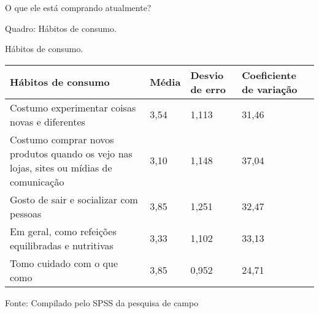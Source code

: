 \begin{commentA} \vspace{0.3cm} \noindent O que ele está comprando atualmente? \par \vspace{0.1cm} \end{commentA}

\begin{commentB}
Quadro: Hábitos de consumo.
\par \end{commentB}

\vspace*{0.3cm}
\begin{quadro}[!htbp]
\begin{footnotesize}
\captionsetup{textfont=bf, labelfont=bf, font=footnotesize, justification=centering}
	\caption {Hábitos de consumo.} \label{tab:habitos} 
	\vspace*{-0.3cm}
		\begin{tabular}{ |>{\raggedright\arraybackslash} m{9.5cm} | P{1.2cm}| P{1.5cm} | P{2cm} | } 
			\hline 
			Hábitos de consumo                                                                     & Média & Desvio de erro & Coeficiente de variação \\ \hline %
			Costumo experimentar coisas novas e diferentes                                          & 3,54 & 1,113 & 31,46 \\ \hline %
			Costumo comprar novos produtos quando os vejo nas lojas, sites ou mídias de comunicação 
			& 3,10 & 1,148 & 37,04 \\ \hline %
			Gosto de sair e socializar com pessoas                                                  & 3,85 & 1,251 & 32,47 \\ \hline %
			Em geral, como refeições equilibradas e nutritivas                                      & 3,33 & 1,102 & 33,13 \\ \hline %
			Tomo cuidado com o que como                                                             & 3,85 & 0,952 & 24,71 \\ \hline %
		\end{tabular}
	\vspace*{-0.5cm}
	\par
	\bigskip
Fonte: Compilado pelo SPSS da pesquisa de campo
\end{footnotesize}
\end{quadro}
\par

